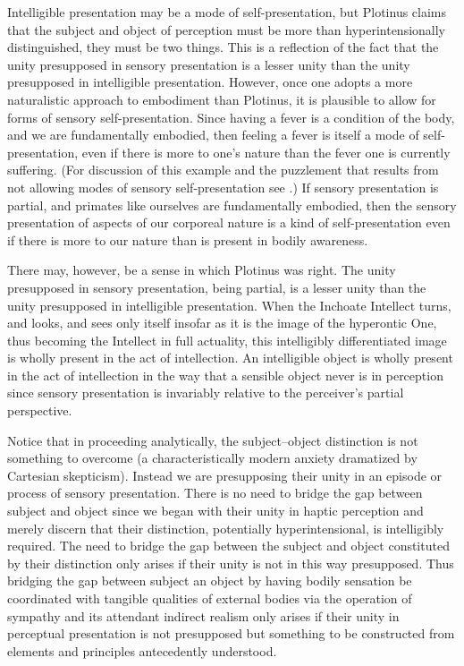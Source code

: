 Intelligible presentation may be a mode of self-presentation, but Plotinus claims that the subject and object of perception must be more than hyperintensionally distinguished, they must be two things. This is a reflection of the fact that the unity presupposed in sensory presentation is a lesser unity than the unity presupposed in intelligible presentation. However, once one adopts a more naturalistic approach to embodiment than Plotinus, it is plausible to allow for forms of sensory self-presentation. Since having a fever is a condition of the body, and we are fundamentally embodied, then feeling a fever is itself a mode of self-presentation, even if there is more to one's nature than the fever one is currently suffering. (For discussion of this example and the puzzlement that results from not allowing modes of sensory self-presentation see \citealt{Yrjonsuuri:2008aa}.) If sensory presentation is partial, and primates like ourselves are fundamentally embodied, then the sensory presentation of aspects of our corporeal nature is a kind of self-presentation even if there is more to our nature than is present in bodily awareness. 

There may, however, be a sense in which Plotinus was right. The unity presupposed in sensory presentation, being partial, is a lesser unity than the unity presupposed in intelligible presentation. When the Inchoate Intellect turns, and looks, and sees only itself insofar as it is the image of the hyperontic One, thus becoming the Intellect in full actuality, this intelligibly differentiated image is wholly present in the act of intellection. An intelligible object is wholly present in the act of intellection in the way that a sensible object never is in perception since sensory presentation is invariably relative to the perceiver's partial perspective.


Notice that in proceeding analytically, the subject--object distinction is not something to overcome (a characteristically modern anxiety dramatized by Cartesian skepticism). Instead we are presupposing their unity in an episode or process of sensory presentation. There is no need to bridge the gap between subject and object since we began with their unity in haptic perception and merely discern that their distinction, potentially hyperintensional, is intelligibly required. The need to bridge the gap between the subject and object constituted by their distinction only arises if their unity is not in this way presupposed. Thus bridging the gap between subject an object by having bodily sensation be coordinated with tangible qualities of external bodies via the operation of sympathy and its attendant indirect realism only arises if their unity in perceptual presentation is not presupposed but something to be constructed from elements and principles antecedently understood. 

